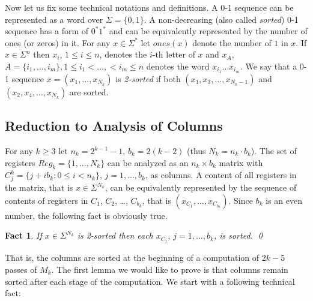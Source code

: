 \documentclass{llncs}
\newtheorem{fact}[theorem]{Fact}
\begin{document}
Now let us fix some technical notations and definitions. A 0-1
sequence can be represented as a word over $\Sigma=\{0,1\}$. A
non-decreasing (also called {\em sorted}) 0-1 sequence has a form of
$0^*1^*$ and can be equivalently represented by the number of ones (or
zeros) in it. For any $x\in\Sigma^*$ let $ones(x)$ denote the number
of $1$ in $x$.  If $x\in\Sigma^n$ then $x_i$, $1\le i\le n$, denotes
the $i$-th letter of $x$ and $x_A$, $A=\{i_1,\ldots,i_m\}, 1\le
i_1<\ldots,<i_m\le n$ denotes the word $x_{i_1}\ldots x_{i_m}$. We say
that a 0-1 sequence $\overline{x}=(x_1,\ldots,x_{N_k})$ is {\em
  2-sorted} if both $(x_1,x_3,\ldots,x_{N_k-1})$ and
$(x_2,x_4,\ldots,x_{N_k})$ are sorted.

\subsection{Reduction to Analysis of Columns}

For any $k\ge 3$ let $n_k=2^{k-1}-1$, $b_k=2(k-2)$ (thus $N_k=n_k\cdot
b_k$). The set of registers $Reg_k=\{1,\ldots,N_k\}$ can be analyzed as an
$n_k\times b_k$ matrix with $C_j^k=\{j+ib_k: 0\le i<n_k\}$,
$j=1,\ldots,b_k$, as columns. A content of all registers in the matrix,
that is $x\in\Sigma^{N_k}$, can be equivalently represented by the
sequence of contents of registers in $C_1$, $C_2$, \ldots, $C_{b_k}$,
that is $(x_{C_1},\ldots,x_{C_{b_k}})$.  Since $b_k$ is an even
number, the following fact is obviously true.
\begin{fact} If $x\in\Sigma^{N_k}$ is 2-sorted then each $x_{C_j}$,
  $j=1,\ldots,b_k$, is sorted. \qed
\end{fact}

That is, the columns are sorted at the beginning of a computation of
$2k-5$ passes of $M_k$. The first lemma we would like to prove is that
columns remain sorted after each stage of the computation. We start
with a following technical fact:
\end{document}
